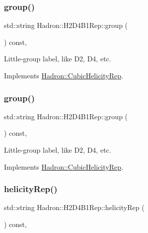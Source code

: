 \subsubsection{\texorpdfstring{group()}{group()}\hspace{0.1cm}{\footnotesize\ttfamily [2/3]}}
{\footnotesize\ttfamily std\+::string Hadron\+::\+H2\+D4\+B1\+Rep\+::group (\begin{DoxyParamCaption}{ }\end{DoxyParamCaption}) const\hspace{0.3cm}{\ttfamily [inline]}, {\ttfamily [virtual]}}

Little-\/group label, like D2, D4, etc. 

Implements \mbox{\hyperlink{structHadron_1_1CubicHelicityRep_a101a7d76cd8ccdad0f272db44b766113}{Hadron\+::\+Cubic\+Helicity\+Rep}}.

\mbox{\label{structHadron_1_1H2D4B1Rep_aabf48ead894c892df15d0203bd7dc107}} 
\subsubsection{\texorpdfstring{group()}{group()}\hspace{0.1cm}{\footnotesize\ttfamily [3/3]}}
{\footnotesize\ttfamily std\+::string Hadron\+::\+H2\+D4\+B1\+Rep\+::group (\begin{DoxyParamCaption}{ }\end{DoxyParamCaption}) const\hspace{0.3cm}{\ttfamily [inline]}, {\ttfamily [virtual]}}

Little-\/group label, like D2, D4, etc. 

Implements \mbox{\hyperlink{structHadron_1_1CubicHelicityRep_a101a7d76cd8ccdad0f272db44b766113}{Hadron\+::\+Cubic\+Helicity\+Rep}}.

\mbox{\label{structHadron_1_1H2D4B1Rep_a0d3def772b80e7f84ff2c62569ffa710}} 
\subsubsection{\texorpdfstring{helicityRep()}{helicityRep()}\hspace{0.1cm}{\footnotesize\ttfamily [1/2]}}
{\footnotesize\ttfamily std\+::string Hadron\+::\+H2\+D4\+B1\+Rep\+::helicity\+Rep (\begin{DoxyParamCaption}{ }\end{DoxyParamCaption}) const\hspace{0.3cm}{\ttfamily [inline]}, {\ttfamily [virtual]}}

